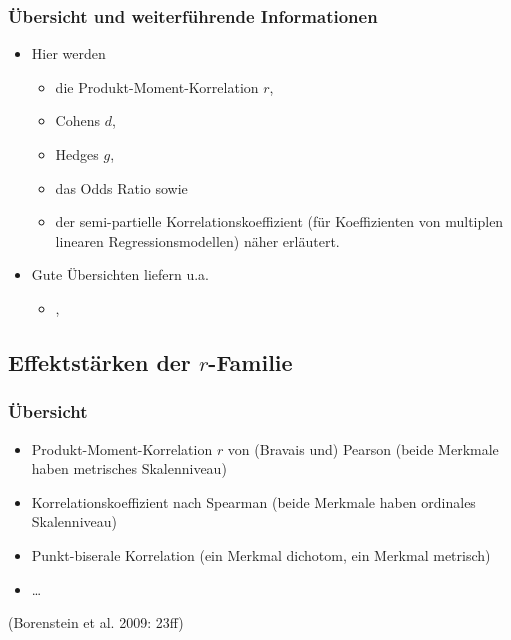 \begin{frame}\frametitle{Übersicht und weiterführende Informationen}
  \begin{itemize}
  \item Hier werden
    \begin{itemize}
    \item die Produkt-Moment-Korrelation $r$,
    \item Cohens $d$,
    \item Hedges $g$,
    \item das Odds Ratio sowie
    \item der semi-partielle Korrelationskoeffizient (für Koeffizienten von
      multiplen linearen Regressionsmodellen) näher erläutert.
    \end{itemize}
  \item Gute Übersichten liefern u.a.
    \begin{itemize}
    \item \citet{borenstein_introduction_2009}, \citet{lipsey_practical_2001}
    \end{itemize}
  \end{itemize}
\end{frame}


\subsection{Effektstärken der $r$-Familie}


\begin{frame}
  \frametitle{Übersicht}
  \begin{itemize}[<+->]
  \item Produkt-Moment-Korrelation $r$ von (Bravais und) Pearson (beide Merkmale haben metrisches Skalenniveau)
  \item Korrelationskoeffizient nach Spearman (beide Merkmale haben ordinales Skalenniveau)
  \item Punkt-biserale Korrelation (ein Merkmal dichotom, ein Merkmal metrisch)
  \item \ldots
  \end{itemize}
  (Borenstein et al. 2009: 23ff)
\end{frame}


